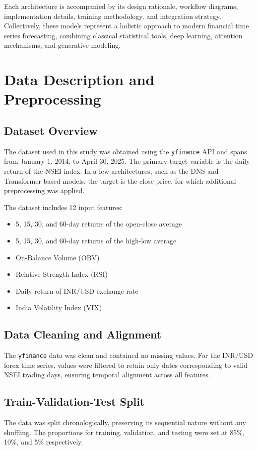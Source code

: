 Each architecture is accompanied by its design rationale, workflow diagrams, implementation details, training methodology, and integration strategy. Collectively, these models represent a holistic approach to modern financial time series forecasting, combining classical statistical tools, deep learning, attention mechanisms, and generative modeling.

\newpage
\section{Data Description and Preprocessing}
\subsection{Dataset Overview}
The dataset used in this study was obtained using the \texttt{yfinance} \cite{yahoo_nifty50_history} API and spans from January 1, 2014, to April 30, 2025. The primary target variable is the daily return of the NSEI index. In a few architectures, such as the DNS and Transformer-based models, the target is the close price, for which additional preprocessing was applied.

The dataset includes 12 input features:
\begin{itemize}
    \item 5, 15, 30, and 60-day returns of the open-close average
    \item 5, 15, 30, and 60-day returns of the high-low average
    \item On-Balance Volume (OBV)
    \item Relative Strength Index (RSI)
    \item Daily return of INR/USD exchange rate
    \item India Volatility Index (VIX) \cite{nse_vix}
\end{itemize}

\subsection{Data Cleaning and Alignment}
The \texttt{yfinance} data was clean and contained no missing values. For the INR/USD forex time series, values were filtered to retain only dates corresponding to valid NSEI trading days, ensuring temporal alignment across all features.

\subsection{Train-Validation-Test Split}
The data was split chronologically, preserving its sequential nature without any shuffling. The proportions for training, validation, and testing were set at 85\%, 10\%, and 5\% respectively.

